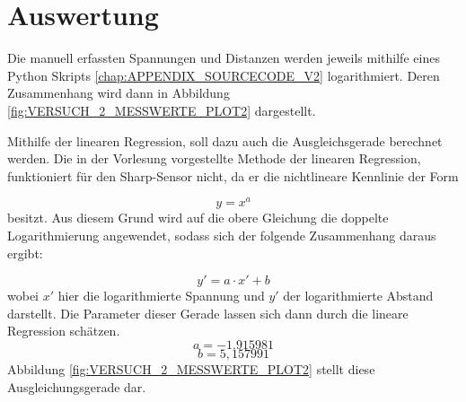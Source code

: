 \documentclass[12pt, oneside, a4paper, \docLanguage]{report}
\begin{document}
\section{Auswertung}
\label{chap:VERSUCH_2_AUSWERTUNG}

Die manuell erfassten Spannungen und Distanzen werden jeweils mithilfe eines Python Skripts \ref{chap:APPENDIX_SOURCECODE_V2} logarithmiert. Deren Zusammenhang wird dann in Abbildung \ref{fig:VERSUCH_2_MESSWERTE_PLOT2} dargestellt.

Mithilfe der linearen Regression, soll dazu auch die Ausgleichsgerade berechnet werden. Die in der Vorlesung vorgestellte Methode der linearen Regression, funktioniert für den Sharp-Sensor nicht, da er die nichtlineare Kennlinie der Form

\[ y = x^a \]
besitzt. Aus diesem Grund wird auf die obere Gleichung die doppelte Logarithmierung angewendet, sodass sich der folgende Zusammenhang daraus ergibt:

\[ y' = a \cdot x' + b \]
wobei \(x'\) hier die logarithmierte Spannung und \(y'\) der logarithmierte Abstand darstellt. Die Parameter dieser Gerade lassen sich dann durch die lineare Regression schätzen.
\[ a = -1.915981 \]
\[ b = 5,157991 \]
Abbildung \ref{fig:VERSUCH_2_MESSWERTE_PLOT2} stellt diese Ausgleichungsgerade dar.
\end{document}
